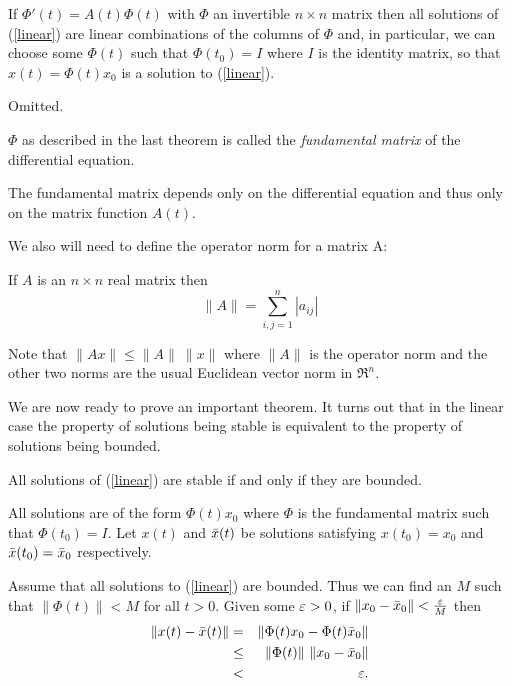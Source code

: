 \documentclass[nols]{tufte-handout}
\theoremstyle{definition}
\begin{document}
\begin{thm}
	If $\Phi '(t) = A(t) \Phi (t)$ with $\Phi$ an invertible $n \times
n$ matrix then all solutions of (\ref{linear}) are linear combinations
of the columns of $\Phi$ and, in particular, we can choose some $\Phi
(t)$ such that $\Phi (t_0) = I$ where $I$ is the identity matrix, so
that $x(t) = \Phi (t) x_0$ is a solution to (\ref{linear}).  \end{thm}

\pf Omitted.

\begin{dfn}
	$\Phi$ as described in the last theorem is called the {\em
fundamental matrix} of the differential equation.
\end{dfn}

The fundamental matrix depends only on the differential equation and
thus only on the matrix function $A(t)$.

We also will need to define the operator norm for a matrix A:

\begin{dfn}
	If $A$ is an $n \times n$ real matrix then
$$\| A \| = \sum^n_{i,j=1} |a_{ij}|$$
\end{dfn}

Note that $\| Ax \| \le \| A \| \  \|x\|$ where $\| A \|$ is the operator
norm and the other two norms are the usual Euclidean vector norm in $\Re^n$.

We are now ready to prove an important theorem.  It turns out that in
the linear case the property of solutions being stable is equivalent
to the property of solutions being bounded.

\begin{thm}
	All solutions of (\ref{linear}) are stable if and only if they are
bounded.
\end{thm}

\pf All solutions are of the form $\Phi (t) x_0$ where $\Phi$ is the
fundamental matrix such that $\Phi (t_0) = I$.  Let $x(t)$ and
$\bar{x}(t)$ be solutions satisfying $x(t_0) = x_0$ and $\bar{x}(t_0) =
\bar{x}_0$ respectively.
  
Assume that all solutions to (\ref{linear}) are bounded.  Thus we can
find an $M$ such that $\| \Phi (t) \| < M$ for all $t > 0$.  Given
some $\varepsilon > 0$, if $\| x_0 - \bar{x}_0 \| < {\varepsilon \over M}$ then
\begin{eqnarray*}
	\| x(t) - \bar{x}(t) \| & = & \| \Phi (t)x_0 - \Phi (t) \bar{x}_0 \| \\
	& \le & \| \Phi (t) \| \ \| x_0 - \bar{x}_0 \| \\
	& < & \varepsilon.
\end{eqnarray*}
\end{document}
